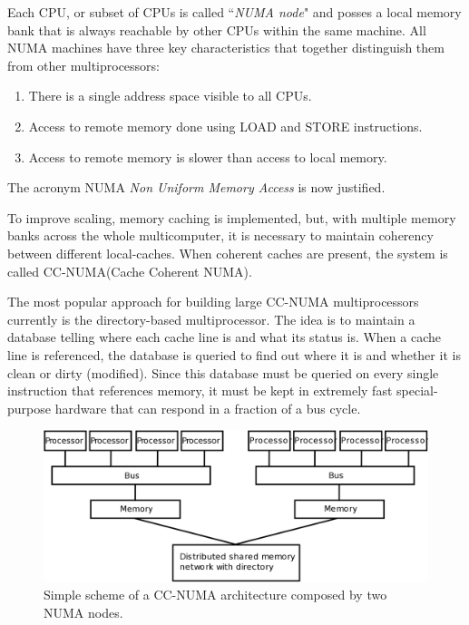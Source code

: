 \documentclass[a4paper,12pt]{article}
\begin{document}
Each CPU, or subset of CPUs is called ``\textit{NUMA node}" and posses a local memory bank that is always reachable by other CPUs within the same machine.
All NUMA machines have three key characteristics that together distinguish
them from other multiprocessors:
\begin{enumerate}
	\item There is a single address space visible to all CPUs.
	\item Access to remote memory done using LOAD and STORE instructions.
	\item Access to remote memory is slower than access to local memory.
\end{enumerate}
The acronym NUMA \textit{Non Uniform Memory Access} is now justified.

To improve scaling, memory caching is implemented, but, with multiple memory banks across the whole multicomputer, it is necessary to maintain coherency between different local-caches.  
When coherent caches are present, the system is called CC-NUMA(Cache Coherent NUMA).

The most popular approach for building large CC-NUMA  multiprocessors currently is the directory-based multiprocessor. The
idea is to maintain a database telling where each cache line is and what its status is.
When a cache line is referenced, the database is queried to find out where it is and
whether it is clean or dirty (modified). Since this database must be queried on
every single instruction that references memory, it must be kept in extremely fast
special-purpose hardware that can respond in a fraction of a bus cycle.

\begin{figure}[hhh!]
\begin{center}
	\includegraphics[width=\linewidth]{NumaScheme.png}	
	\caption{Simple scheme of a CC-NUMA architecture composed by two NUMA nodes.}
	\label{fig:sgiLoad}
\end{center}
\end{figure}
\end{document}
